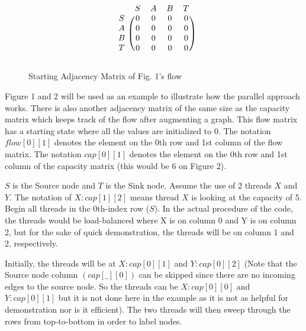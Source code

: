         \begin{figure}[H]
            \centering
            \[
                \begin{blockarray}{ccccc}
                    & S & A & B & T \\
                    \begin{block}{c(cccc)}
                        S & 0 & 0 & 0 & 0 \\
                        A & 0 & 0 & 0 & 0 \\
                        B & 0 & 0 & 0 & 0 \\
                        T & 0 & 0 & 0 & 0 \\
                    \end{block}
                \end{blockarray}
            \]
            \caption{Starting Adjacency Matrix of Fig. 1's flow}
        \end{figure}
        
        Figure 1 and 2 will be used as an example to illustrate how the parallel approach works. There is also another adjacency matrix of the same size as the capacity matrix which keeps track of the flow after augmenting a graph. This flow matrix has a starting state where all the values are initialized to 0. The notation $flow[0][1]$ denotes the element on the 0th row and 1st column of the flow matrix. The notation $cap[0][1]$ denotes the element on the 0th row and 1st column of the capacity matrix (this would be 6 on Figure 2).
        
        
        
        $S$ is the Source node and $T$ is the Sink node. Assume the use of 2 threads $X$ and $Y$. The notation of $X:cap[1][2]$ means thread $X$ is looking at the capacity of 5. Begin all threads in the 0th-index row ($S$). In the actual procedure of the code, the threads would be load-balanced where X is on column 0 and Y is on column 2, but for the sake of quick demonstration, the threads will be on column 1 and 2, respectively.
        
        
        Initially, the threads will be at $X:cap[0][1]$ and $Y:cap[0][2]$ (Note that the Source node column $(cap[\_][0])$ can be skipped since there are no incoming edges to the source node. So the threads can be $X:cap[0][0]$ and $Y:cap[0][1]$ but it is not done here in the example as it is not as helpful for demonstration nor is it efficient). The two threads will then sweep through the rows from top-to-bottom in order to label nodes.
        
